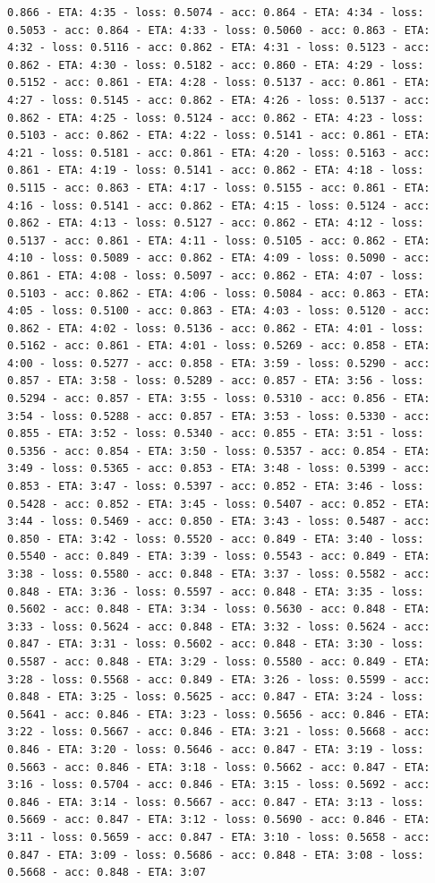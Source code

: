 \documentclass[11pt]{article}
\begin{document}
\begin{Verbatim}[commandchars=\\\{\}]
0.866 - ETA: 4:35 - loss: 0.5074 - acc: 0.864 - ETA: 4:34 - loss: 0.5053 - acc: 0.864 - ETA: 4:33 - loss: 0.5060 - acc: 0.863 - ETA: 4:32 - loss: 0.5116 - acc: 0.862 - ETA: 4:31 - loss: 0.5123 - acc: 0.862 - ETA: 4:30 - loss: 0.5182 - acc: 0.860 - ETA: 4:29 - loss: 0.5152 - acc: 0.861 - ETA: 4:28 - loss: 0.5137 - acc: 0.861 - ETA: 4:27 - loss: 0.5145 - acc: 0.862 - ETA: 4:26 - loss: 0.5137 - acc: 0.862 - ETA: 4:25 - loss: 0.5124 - acc: 0.862 - ETA: 4:23 - loss: 0.5103 - acc: 0.862 - ETA: 4:22 - loss: 0.5141 - acc: 0.861 - ETA: 4:21 - loss: 0.5181 - acc: 0.861 - ETA: 4:20 - loss: 0.5163 - acc: 0.861 - ETA: 4:19 - loss: 0.5141 - acc: 0.862 - ETA: 4:18 - loss: 0.5115 - acc: 0.863 - ETA: 4:17 - loss: 0.5155 - acc: 0.861 - ETA: 4:16 - loss: 0.5141 - acc: 0.862 - ETA: 4:15 - loss: 0.5124 - acc: 0.862 - ETA: 4:13 - loss: 0.5127 - acc: 0.862 - ETA: 4:12 - loss: 0.5137 - acc: 0.861 - ETA: 4:11 - loss: 0.5105 - acc: 0.862 - ETA: 4:10 - loss: 0.5089 - acc: 0.862 - ETA: 4:09 - loss: 0.5090 - acc: 0.861 - ETA: 4:08 - loss: 0.5097 - acc: 0.862 - ETA: 4:07 - loss: 0.5103 - acc: 0.862 - ETA: 4:06 - loss: 0.5084 - acc: 0.863 - ETA: 4:05 - loss: 0.5100 - acc: 0.863 - ETA: 4:03 - loss: 0.5120 - acc: 0.862 - ETA: 4:02 - loss: 0.5136 - acc: 0.862 - ETA: 4:01 - loss: 0.5162 - acc: 0.861 - ETA: 4:01 - loss: 0.5269 - acc: 0.858 - ETA: 4:00 - loss: 0.5277 - acc: 0.858 - ETA: 3:59 - loss: 0.5290 - acc: 0.857 - ETA: 3:58 - loss: 0.5289 - acc: 0.857 - ETA: 3:56 - loss: 0.5294 - acc: 0.857 - ETA: 3:55 - loss: 0.5310 - acc: 0.856 - ETA: 3:54 - loss: 0.5288 - acc: 0.857 - ETA: 3:53 - loss: 0.5330 - acc: 0.855 - ETA: 3:52 - loss: 0.5340 - acc: 0.855 - ETA: 3:51 - loss: 0.5356 - acc: 0.854 - ETA: 3:50 - loss: 0.5357 - acc: 0.854 - ETA: 3:49 - loss: 0.5365 - acc: 0.853 - ETA: 3:48 - loss: 0.5399 - acc: 0.853 - ETA: 3:47 - loss: 0.5397 - acc: 0.852 - ETA: 3:46 - loss: 0.5428 - acc: 0.852 - ETA: 3:45 - loss: 0.5407 - acc: 0.852 - ETA: 3:44 - loss: 0.5469 - acc: 0.850 - ETA: 3:43 - loss: 0.5487 - acc: 0.850 - ETA: 3:42 - loss: 0.5520 - acc: 0.849 - ETA: 3:40 - loss: 0.5540 - acc: 0.849 - ETA: 3:39 - loss: 0.5543 - acc: 0.849 - ETA: 3:38 - loss: 0.5580 - acc: 0.848 - ETA: 3:37 - loss: 0.5582 - acc: 0.848 - ETA: 3:36 - loss: 0.5597 - acc: 0.848 - ETA: 3:35 - loss: 0.5602 - acc: 0.848 - ETA: 3:34 - loss: 0.5630 - acc: 0.848 - ETA: 3:33 - loss: 0.5624 - acc: 0.848 - ETA: 3:32 - loss: 0.5624 - acc: 0.847 - ETA: 3:31 - loss: 0.5602 - acc: 0.848 - ETA: 3:30 - loss: 0.5587 - acc: 0.848 - ETA: 3:29 - loss: 0.5580 - acc: 0.849 - ETA: 3:28 - loss: 0.5568 - acc: 0.849 - ETA: 3:26 - loss: 0.5599 - acc: 0.848 - ETA: 3:25 - loss: 0.5625 - acc: 0.847 - ETA: 3:24 - loss: 0.5641 - acc: 0.846 - ETA: 3:23 - loss: 0.5656 - acc: 0.846 - ETA: 3:22 - loss: 0.5667 - acc: 0.846 - ETA: 3:21 - loss: 0.5668 - acc: 0.846 - ETA: 3:20 - loss: 0.5646 - acc: 0.847 - ETA: 3:19 - loss: 0.5663 - acc: 0.846 - ETA: 3:18 - loss: 0.5662 - acc: 0.847 - ETA: 3:16 - loss: 0.5704 - acc: 0.846 - ETA: 3:15 - loss: 0.5692 - acc: 0.846 - ETA: 3:14 - loss: 0.5667 - acc: 0.847 - ETA: 3:13 - loss: 0.5669 - acc: 0.847 - ETA: 3:12 - loss: 0.5690 - acc: 0.846 - ETA: 3:11 - loss: 0.5659 - acc: 0.847 - ETA: 3:10 - loss: 0.5658 - acc: 0.847 - ETA: 3:09 - loss: 0.5686 - acc: 0.848 - ETA: 3:08 - loss: 0.5668 - acc: 0.848 - ETA: 3:07 
\end{Verbatim}
\end{document}
